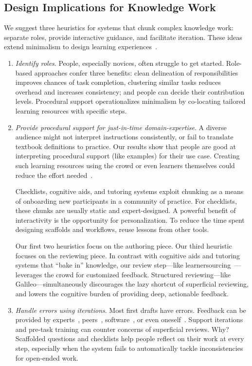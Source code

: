 \subsection{Design Implications for Knowledge Work}
We suggest three heuristics for systems that chunk complex knowledge work: separate roles, provide interactive guidance, and facilitate iteration. These ideas extend minimalism to design learning experiences~\cite{VanderMeij1995}. 

\begin{enumerate}
\item \textit{Identify roles}. People, especially novices, often struggle to get started. Role-based approaches confer three benefits: clean delineation of responsibilities improves chances of task completion, clustering similar tasks reduces overhead and increases consistency; and people can decide their contribution levels. Procedural support operationalizes minimalism by co-locating tailored learning resources with specific steps.

\item \textit{Provide procedural support for just-in-time domain-expertise}. A diverse audience might not interpret instructions consistently, or fail to translate textbook definitions to practice. Our results show that people are good at interpreting procedural support (like examples) for their use case. Creating such learning resources using the crowd or even learners themselves could reduce the effort needed~\cite{Kim2014c}. 

Checklists, cognitive aids, and tutoring systems exploit chunking as a means of onboarding new participants in a community of practice. For checklists, these chunks are usually static and expert-designed. A powerful benefit of interactivity is the opportunity for personalization. To reduce the time spent designing scaffolds and workflows, reuse lessons from other tools.
 
Our first two heuristics focus on the authoring piece. Our third heuristic focuses on the reviewing piece. In contrast with cognitive aids and tutoring systems that “bake in” knowledge, our review step---like learnersourcing~\cite{Kim2014c}---leverages the crowd for customized feedback. Structured reviewing---like Galileo---simultaneously discourages the lazy shortcut of superficial reviewing, and lowers the cognitive burden of providing deep, actionable feedback. 

\item \textit{Handle errors using iterations}. Most first drafts have errors. Feedback can be provided by experts~\cite{dow2012shepherding, schon1984reflective}, peers~\cite{Boud1995, Kulkarni2015b}, software~\cite{Dantoni2015}, or even oneself~\cite{Boud1995, schon1984reflective}. Support iterations and pre-task training can counter concerns of superficial reviews. Why? Scaffolded questions and checklists help people reflect on their work at every step, especially when the system fails to automatically tackle inconsistencies for open-ended work.
\end{enumerate}

